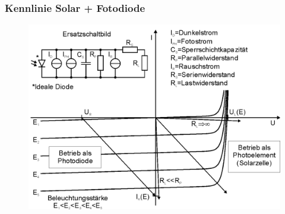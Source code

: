 \begin{frame}
  \frametitle{Kennlinie Solar + Fotodiode}
  \begin{center}
    \begin{figure}
      \includegraphics[width=1\textwidth,height=.75\textheight,keepaspectratio]{a05/Kennlinie_Photodiode_1.png}
    \end{figure}
  \end{center}
\end{frame}

